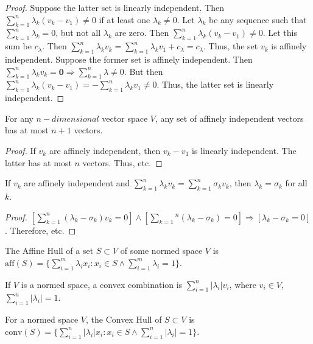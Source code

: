 \documentclass[crop=false,class=article,oneside]{standalone}
\begin{document}
            \begin{proof}
            Suppose the latter set is linearly independent. Then $\sum_{k=1}^{n} \lambda_k(v_k-v_1) \ne 0$ if at least one $\lambda_k \ne 0$. Let $\lambda_k$ be any sequence such that $\sum_{k=1}^{n} \lambda_k = 0$, but not all $\lambda_k$ are zero. Then $\sum_{k=1}^{n} \lambda_k(v_k-v_1)\ne 0$. Let this sum be $c_{\lambda}$. Then $\sum_{k=1}^{n} \lambda_k v_k = \sum_{k=1}^{n} \lambda_k v_1 + c_\lambda = c_{\lambda}$. Thus, the set $v_k$ is affinely independent. Suppose the former set is affinely independent. Then $\sum_{k=1}^{n} \lambda_k v_k = \mathbf{0} \Rightarrow \sum_{k=1}^{n} \lambda \ne 0$. But then $\sum_{k=1}^{n}\lambda_k (v_k-v_1) = - \sum_{k=1}^{n} \lambda_k v_1 \ne 0$. Thus, the latter set is linearly independent.
            \end{proof}
            \begin{corollary}
            For any $n-dimensional$ vector space $V$, any set of affinely independent vectors has at most $n+1$ vectors.
            \end{corollary}
            \begin{proof}
            If $v_k$ are affinely independent, then $v_k-v_1$ is linearly independent. The latter has at most $n$ vectors. Thus, etc.
            \end{proof}
            \begin{corollary}
            If $v_k$ are affinely independent and $\sum_{k=1}^{n}\lambda_k v_k = \sum_{k=1}^{n} \sigma_k v_k$, then $\lambda_k = \sigma_k$ for all $k$.
            \end{corollary}
            \begin{proof}
            $[\sum_{k=1}^{n}(\lambda_k - \sigma_k)v_k = 0]\land[\sum_{k=1}{^n}(\lambda_k-\sigma_k) = 0]\Rightarrow [\lambda_k-\sigma_k = 0]$. Therefore, etc.
            \end{proof}
            \begin{definition}
            The Affine Hull of a set $S\subset V$ of some normed space $V$ is $\textrm{aff}(S) = \{\sum_{i=1}^{m}\lambda_i x_i: x_i \in S\land \sum_{i=1}^{m}\lambda_i =1\}$.
            \end{definition}
            \begin{definition}
            If $V$ is a normed space, a convex combination is $\sum_{i=1}^{n}|\lambda_i| v_i$, where $v_i\in V$, $\sum_{i=1}^{n}|\lambda_i| = 1$.
            \end{definition}
            \begin{definition}
            For a normed space $V$, the Convex Hull of $S\subset V$ is $\textrm{conv}(S)=\{\sum_{i=1}^{n}|\lambda_i| x_i:x_i\in S\land \sum_{i=1}^{n} |\lambda_i| = 1 \}$.
            \end{definition}
\end{document}

